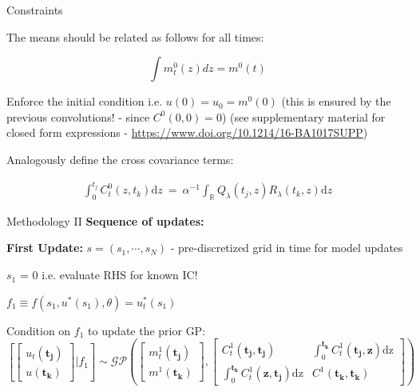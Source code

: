 \documentclass[usenames,dvipsnames]{beamer}
\theoremstyle{definition}
\begin{document}
\begin{frame}{Constraints}

The means should be related as follows for all times:
    
    $$\int m_t^0 (z) dz = m^0(t)$$

Enforce the initial condition i.e.  $u(0)=u_0=m^0(0)$ (this is ensured by the previous convolutions! - since $C^0(0, 0)=0$) (see supplementary material for closed form expressions - \url{https://www.doi.org/10.1214/16-BA1017SUPP})

Analogously define the cross covariance terms:

$$\begin{aligned}\int_0^{t_j}C_t^0(z,t_k)\mathrm{d}z~=~\alpha^{-1}\int_{\mathbb{R}}Q_\lambda(t_j,z)R_\lambda(t_k,z)\mathrm{d}z\end{aligned}$$

\end{frame}


\begin{frame}{Methodology II}
\textbf{Sequence of updates: }

\textbf{First Update:}
$s=(s_1, \cdots, s_N)$ - pre-discretized grid in time for model updates

$s_1$ = 0 i.e. evaluate RHS for known IC!

$f_1 \equiv f(s_1, u^{\ast}(s_1), \theta) = u_t^{\ast}(s_1)$

Condition on $f_1$ to update the prior GP:
$$\left [ \begin{bmatrix}u_t(\mathbf{t_j})\\u(\mathbf{t_k})\end{bmatrix} \vert f_1 \right ]\sim\mathcal{GP}\left (\begin{bmatrix}m_t^1(\mathbf{t_j})\\m^1(\mathbf{t_k})\end{bmatrix},\begin{bmatrix}C_t^1(\mathbf{t_j},\mathbf{t_j})&\int_0^{\mathbf{t_k}}C_t^1(\mathbf{t_j},\mathbf{z})\mathrm{dz}\\ \int_0^{\mathbf{t_k}}C_t^1(\mathbf{z},\mathbf{t_j})\mathrm{dz}&C^1(\mathbf{t_k},\mathbf{t_k})\end{bmatrix} \right )$$

\end{frame}
\end{document}
